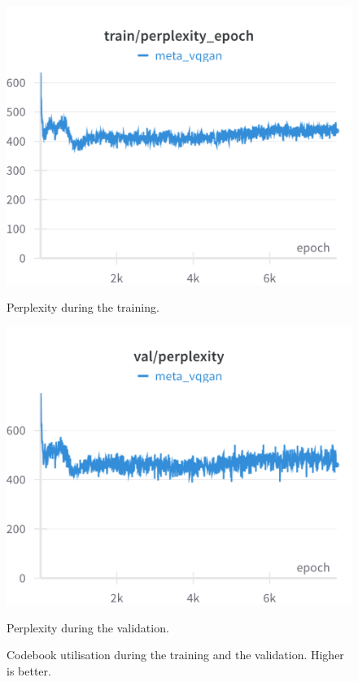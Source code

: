 \begin{figure}[H]
\includegraphics[width=\linewidth]{detailed_engineering/Meta VQGAN/charts/Section-2-Panel-1-5nrgzgmoj.png}
\caption{Perplexity during the training.}
\endminipage\hfill
{}
\includegraphics[width=\linewidth]{detailed_engineering/Meta VQGAN/charts/Section-4-Panel-1-njiwngfn7.png}
\caption{Perplexity during the validation.}
\endminipage
\caption{Codebook utilisation during the training and the validation. Higher is better.}
\end{figure}


